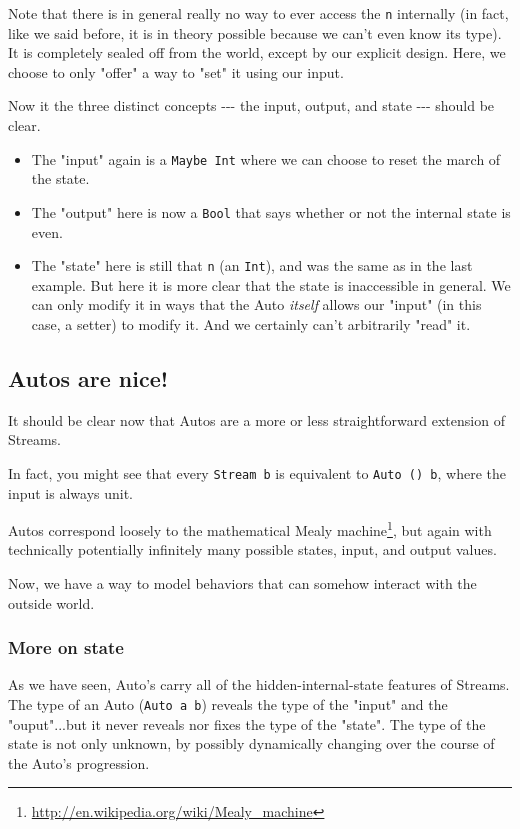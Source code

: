 \documentclass[]{article}
\renewcommand{\href}[2]{#2\footnote{\url{#1}}}
\begin{document}
Note that there is in general really no way to ever access the \texttt{n}
internally (in fact, like we said before, it is in theory possible because we
can't even know its type). It is completely sealed off from the world, except by
our explicit design. Here, we choose to only "offer" a way to "set" it using our
input.

Now it the three distinct concepts -\/-\/- the input, output, and state -\/-\/-
should be clear.

\begin{itemize}
\tightlist
\item
  The "input" again is a \texttt{Maybe\ Int} where we can choose to reset the
  march of the state.
\item
  The "output" here is now a \texttt{Bool} that says whether or not the internal
  state is even.
\item
  The "state" here is still that \texttt{n} (an \texttt{Int}), and was the same
  as in the last example. But here it is more clear that the state is
  inaccessible in general. We can only modify it in ways that the Auto
  \emph{itself} allows our "input" (in this case, a setter) to modify it. And we
  certainly can't arbitrarily "read" it.
\end{itemize}

\subsection{Autos are nice!}

It should be clear now that Autos are a more or less straightforward extension
of Streams.

In fact, you might see that every \texttt{Stream\ b} is equivalent to
\texttt{Auto\ ()\ b}, where the input is always unit.

Autos correspond loosely to the mathematical
\href{http://en.wikipedia.org/wiki/Mealy_machine}{Mealy machine}, but again with
technically potentially infinitely many possible states, input, and output
values.

Now, we have a way to model behaviors that can somehow interact with the outside
world.

\subsubsection{More on state}

As we have seen, Auto's carry all of the hidden-internal-state features of
Streams. The type of an Auto (\texttt{Auto\ a\ b}) reveals the type of the
"input" and the "ouput"...but it never reveals nor fixes the type of the
"state". The type of the state is not only unknown, by possibly dynamically
changing over the course of the Auto's progression.
\end{document}
